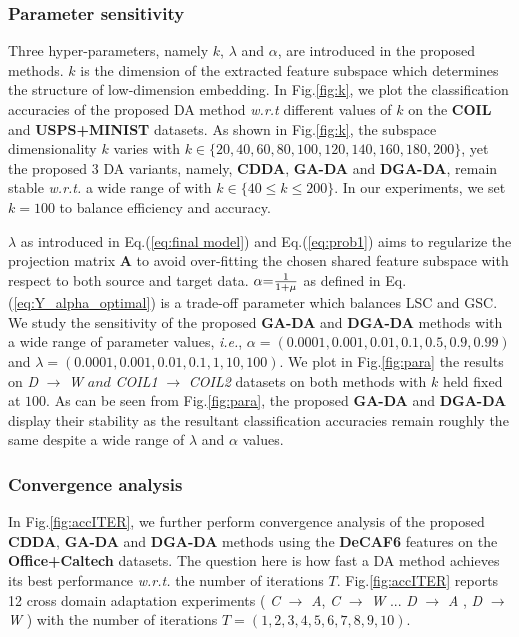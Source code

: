 \documentclass[journal,twocolumn]{IEEEtran}
\begin{document}
\begin{CJK*}{UTF8}{gkai}
\subsubsection{Parameter sensitivity}
\label{subsubsection: Parameter sensitivity}
	
Three hyper-parameters, namely  $k$, $\lambda$ and $\alpha$, are introduced in the proposed methods.  $k$ is the dimension of the extracted feature subspace which determines the structure of low-dimension embedding. In Fig.\ref{fig:k}, we plot the classification accuracies of the proposed DA method \textit{w.r.t} different values of $k$ on the  \textbf{COIL} and \textbf{USPS+MINIST} datasets. As shown in Fig.\ref{fig:k}, the subspace dimensionality $k$ varies with $k  \in \{20,40,60,80,100,120,140,160,180,200\}$, yet the proposed 3 DA variants, namely, \textbf{CDDA}, \textbf{GA-DA} and \textbf{DGA-DA}, remain stable \textit{w.r.t.}  a wide range of with $k \in \{ 40 \le k  \le 200\} $. In our experiments,  we set $k = 100$ to balance efficiency and accuracy.



$\lambda$ as introduced in Eq.(\ref{eq:final model}) and Eq.(\ref{eq:prob1}) aims to regularize the projection matrix $\textbf{A}$ to avoid over-fitting the chosen shared feature subspace with respect to both source and target data.  $\alpha {\rm{ = }}\frac{1}{{1 + \mu }}$ as defined in Eq.(\ref{eq:Y_alpha_optimal}) is a trade-off parameter which balances  LSC and GSC. We study the sensitivity of the proposed \textbf{GA-DA} and \textbf{DGA-DA} methods with a wide range of parameter values, \textit{i.e.}, $\alpha  = (0.0001,0.001,0.01,0.1,0.5,0.9,0.99)$ and $\lambda  = (0.0001,0.001,0.01,0.1,1,10,100)$. We plot in Fig.\ref{fig:para} the results on \emph{D} $\rightarrow$ \emph{W} $ and $ \emph{COIL1} $\rightarrow$ \emph{COIL2} datasets on both methods with $k$ held fixed at $100$. As can be seen from Fig.\ref{fig:para}, the proposed \textbf{GA-DA} and \textbf{DGA-DA} display their stability as the resultant classification  accuracies remain roughly the same despite  a wide range of $\lambda $ and $\alpha $ values. 

\subsubsection{Convergence analysis}
\label{subsubsection: Convergence analysis}


In Fig.\ref{fig:accITER}, we further perform  convergence analysis of the proposed  \textbf{CDDA}, \textbf{GA-DA} and \textbf{DGA-DA} methods  using the \textbf{DeCAF6} features on the \textbf{Office+Caltech} datasets. The question here is how fast a DA method achieves its best performance \textit{w.r.t.} the number of iterations $T$.
Fig.\ref{fig:accITER} reports 12 cross domain adaptation experiments ( \emph{C} $\rightarrow$ \emph{A}, \emph{C} $\rightarrow$ \emph{W} ... \emph{D} $\rightarrow$ \emph{A} , \emph{D} $\rightarrow$ \emph{W}  ) with the number of iterations $T = (1,2,3,4,5,6,7,8,9,10)$. 
 

\end{CJK*}
\end{document}
